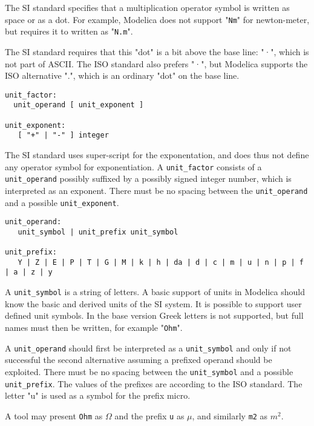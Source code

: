 The SI standard specifies that a multiplication operator symbol is written as space 
or as a dot. For example, Modelica does not support "\lstinline!Nm!" for
newton-meter, 
but requires it to written as "\lstinline!N.m!". 

The SI standard requires that this "dot" is a bit above the base line: "·", which is not part of ASCII. 
The ISO standard also prefers "·", but Modelica supports the ISO alternative ".", which is an ordinary "dot" on the base line.

\begin{lstlisting}[language=grammar]
unit_factor:
  unit_operand [ unit_exponent ]

unit_exponent:
   [ "+" | "-" ] integer
\end{lstlisting}

The SI standard uses super-script for the exponentation, and does thus not define any operator symbol for exponentiation.
A \lstinline!unit_factor! consists of a \lstinline!unit_operand! possibly suffixed by a
possibly signed integer number, which is interpreted as an exponent.
There must be no spacing between the \lstinline!unit_operand! and a possible
\lstinline!unit_exponent!.

\begin{lstlisting}[language=grammar]
unit_operand:
   unit_symbol | unit_prefix unit_symbol

unit_prefix:
   Y | Z | E | P | T | G | M | k | h | da | d | c | m | u | n | p | f | a | z | y
\end{lstlisting}

A \lstinline!unit_symbol! is a string of letters. A basic support of units in
Modelica should know the basic and derived units of the SI system. It is
possible to support user defined unit symbols. In the base version Greek
letters is not supported, but full names must then be written, for
example "\lstinline!Ohm!".

A \lstinline!unit_operand! should first be interpreted as a \lstinline!unit_symbol! and only
if not successful the second alternative assuming a prefixed operand
should be exploited. There must be no spacing between the \lstinline!unit_symbol!
and a possible \lstinline!unit_prefix!. The values of the prefixes are according to
the ISO standard. The letter "u" is used as a symbol for the prefix
micro.

\begin{nonnormative}
A tool may present \lstinline!Ohm! as $\Omega$ and the prefix \lstinline!u! as $\mu$, and similarly \lstinline!m2! as $m^2$. 
\end{nonnormative}

